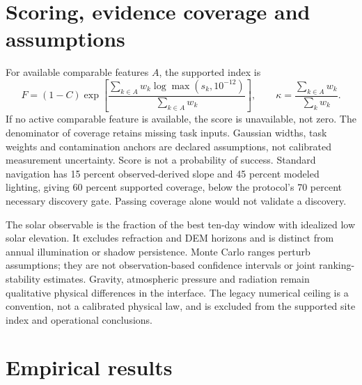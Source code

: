 \documentclass[10pt,a4paper]{article}
\begin{document}
\section{Scoring, evidence coverage and assumptions}
For available comparable features $A$, the supported index is
\[
 F=(1-C)\exp\left[\frac{\sum_{k\in A}w_k\log\max(s_k,10^{-12})}
 {\sum_{k\in A}w_k}\right],\qquad
 \kappa=\frac{\sum_{k\in A}w_k}{\sum_k w_k}.
\]
If no active comparable feature is available, the score is unavailable, not zero.
The denominator of coverage retains missing task inputs. Gaussian widths, task
weights and contamination anchors are declared assumptions, not calibrated
measurement uncertainty. Score is not a probability of success. Standard
navigation has 15 percent observed-derived slope and 45 percent modeled lighting,
giving 60 percent supported coverage, below the protocol's 70 percent necessary
discovery gate. Passing coverage alone would not validate a discovery.

The solar observable is the fraction of the best ten-day window with idealized
low solar elevation. It excludes refraction and DEM horizons and is distinct
from annual illumination or shadow persistence. Monte Carlo ranges perturb
assumptions; they are not observation-based confidence intervals or joint
ranking-stability estimates. Gravity, atmospheric pressure and radiation remain
qualitative physical differences in the interface. The legacy numerical ceiling
is a convention, not a calibrated physical law, and is excluded from the supported
site index and operational conclusions.

\section{Empirical results}
\end{document}
